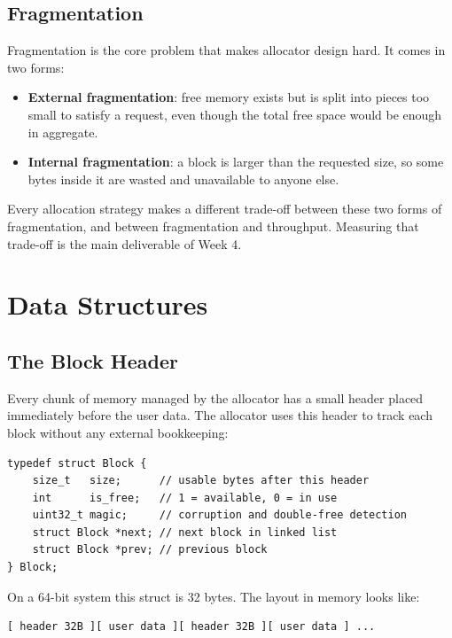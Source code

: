\documentclass[12pt, a4paper]{report}
\begin{document}
\section{Fragmentation}

Fragmentation is the core problem that makes allocator design hard. It comes in
two forms:

\begin{itemize}
  \item \textbf{External fragmentation}: free memory exists but is split into
    pieces too small to satisfy a request, even though the total free space would
    be enough in aggregate.
  \item \textbf{Internal fragmentation}: a block is larger than the requested
    size, so some bytes inside it are wasted and unavailable to anyone else.
\end{itemize}

Every allocation strategy makes a different trade-off between these two forms of
fragmentation, and between fragmentation and throughput. Measuring that
trade-off is the main deliverable of Week 4.

\chapter{Data Structures}

\section{The Block Header}

Every chunk of memory managed by the allocator has a small header placed
immediately before the user data. The allocator uses this header to track each
block without any external bookkeeping:

\begin{lstlisting}
typedef struct Block {
    size_t   size;      // usable bytes after this header
    int      is_free;   // 1 = available, 0 = in use
    uint32_t magic;     // corruption and double-free detection
    struct Block *next; // next block in linked list
    struct Block *prev; // previous block
} Block;
\end{lstlisting}

On a 64-bit system this struct is 32 bytes. The layout in memory looks like:

\begin{lstlisting}[style=shellstyle, numbers=none]
[ header 32B ][ user data ][ header 32B ][ user data ] ...
\end{lstlisting}
\end{document}

